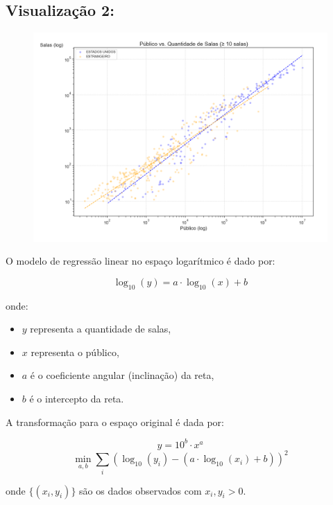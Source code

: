\documentclass{article}
\begin{document}
\lipsum[1-2]   %
\subsection*{Visualização 2:}
\begin{figure}[H]
    \centerline{\includegraphics[width = \linewidth]{img/Figure_2.png}}
\end{figure}

O modelo de regressão linear no espaço logarítmico é dado por:

\[
\log_{10}(y) = a \cdot \log_{10}(x) + b
\]

onde:
\begin{itemize}
    \item \(y\) representa a quantidade de salas,
    \item \(x\) representa o público,
    \item \(a\) é o coeficiente angular (inclinação) da reta,
    \item \(b\) é o intercepto da reta.
\end{itemize}

\bigskip

A transformação para o espaço original é dada por:

\[
y = 10^{b} \cdot x^{a}
\]
\[
\min_{a,b} \sum_{i} \left( \log_{10}(y_i) - \left(a \cdot \log_{10}(x_i) + b \right) \right)^2
\]

onde \(\{(x_i, y_i)\}\) são os dados observados com \(x_i, y_i > 0\).
\end{document}
